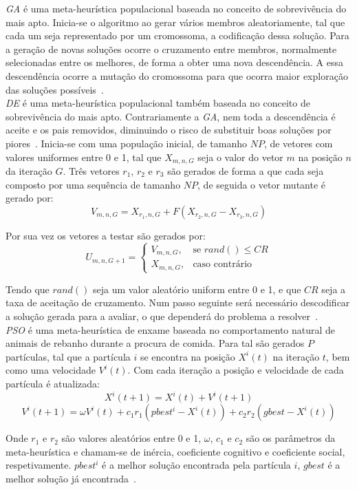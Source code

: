 \textit{GA} é uma meta-heurística populacional baseada no conceito de sobrevivência do mais apto. Inicia-se o algoritmo ao gerar vários membros aleatoriamente, tal que cada um seja representado por um cromossoma, a codificação dessa solução. Para a geração de novas soluções ocorre o cruzamento entre membros, normalmente selecionadas entre os melhores, de forma a obter uma nova descendência. A essa descendência ocorre a mutação do cromossoma para que ocorra maior exploração das soluções possíveis~\cite{katochReviewGeneticAlgorithm2021}.\\

\textit{DE} é uma meta-heurística populacional também baseada no conceito de sobrevivência do mais apto. Contrariamente a \textit{GA}, nem toda a descendência é aceite e os pais removidos, diminuindo o risco de substituir boas soluções por piores~\cite{shilpaJobShopScheduling2018}. Inicia-se com uma população inicial, de tamanho $NP$, de vetores com valores uniformes entre 0 e 1, tal que $X_{m,n,G}$ seja o valor do vetor $m$ na posição $n$ da iteração $G$. Três vetores $r_{1}$, $r_{2}$ e $r_{3}$ são gerados de forma a que cada seja composto por uma sequência de tamanho $NP$, de seguida o vetor mutante é gerado por:
$$V_{m,n,G}=X_{r_{1},n,G}+F(X_{r_{2},n,G}-X_{r_{3},n,G})$$

Por sua vez os vetores a testar são gerados por:
$$
U_{m,n,G+1}= 
\begin{cases}
	V_{m,n,G}   ,& \text{se } rand()\leq CR\\
    X_{m,n,G}   ,& \text{caso contrário}
\end{cases}
$$

Tendo que $rand()$ seja um valor aleatório uniform entre 0 e 1, e que $CR$ seja a taxa de aceitação de cruzamento. Num passo seguinte será necessário descodificar a solução gerada para a avaliar, o que dependerá do problema a resolver~\cite{sriboonchandrImprovedDifferentialEvolution2019}.\\

\textit{PSO} é uma meta-heurística de enxame baseada no comportamento natural de animais de rebanho durante a procura de comida. Para tal são gerados $P$ partículas, tal que a partícula $i$ se encontra na posição $X^{i}(t)$ na iteração $t$, bem como uma velocidade $V^{i}(t)$. Com cada iteração a posição e velocidade de cada partícula é atualizada:
$$X^{i}(t+1)=X^{i}(t)+V^{i}(t+1)$$
$$V^{i}(t+1)=\omega V^{i}(t)+c_{1}r_{1}(pbest^{i}-X^{i}(t))+c_{2}r_{2}(gbest-X^{i}(t))$$

Onde $r_{1}$ e $r_{2}$ são valores aleatórios entre 0 e 1, $\omega$, $c_{1}$ e $c_{2}$ são os parâmetros da meta-heurística e chamam-se de inércia, coeficiente cognitivo e coeficiente social, respetivamente. $pbest^{i}$ é a melhor solução encontrada pela partícula $i$, $gbest$ é a melhor solução já encontrada~\cite{ParticleSwarmOptimization2025}.\\

